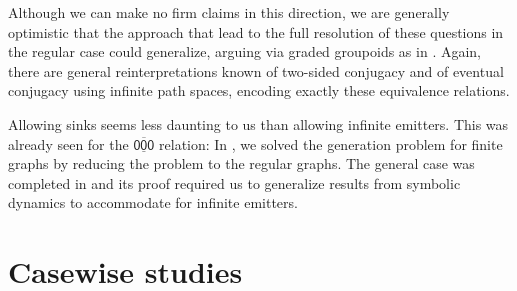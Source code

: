 \documentclass[12pt]{amsbook}%
\theoremstyle{defin}
\theoremstyle{remark}
\numberwithin{equation}{chapter}
\numberwithin{theor}{section}
\newcommand{\xyz}[1]{\mbox{$\mathsf{#1}$}}
\newcommand{\xyzrel}[1]{\mbox{$\overline{\underline{\mathsf{ #1}}}$}}
\begin{document}
Although we can make no firm claims in this direction, we are generally optimistic that the approach that lead to the full resolution of these questions in the regular case could generalize, arguing via graded groupoids as in \cite{tmcjr:dgigc}. Again, there are general reinterpretations known of two-sided conjugacy and of eventual conjugacy using infinite path spaces, encoding exactly these equivalence relations.

Allowing sinks seems less daunting to us than allowing infinite emitters.  This was already seen for the $\xyzrel{000}$ relation:  In \cite{segrerapws:gcgcfg}, we solved the generation problem for finite graphs by reducing the problem to the regular graphs.  The general case was completed in \cite{segrerapws:ccuggs} and its proof required us to generalize results from symbolic dynamics to accommodate for infinite emitters.

\part{Casewise studies}\label{casepart}
\newcommand{\elsewhere}{\cellcolor{lgray}{}}
\newcommand{\elsewhered}{\cellcolor{lgray}{+}}
\newcommand{\here}{\cellcolor{orange}{}}
\newcommand{\hered}{\cellcolor{orange}{+}}
\newcommand{\sopen}{\cellcolor{black}{}}
\newcommand{\sopenbut}{\cellcolor{black}{\textcolor{white}{!}}}
\newcommand{\statusbar}[8]{\begin{center}\begin{tabular}{|c|c|c|c|c|c|c|c|}\hline\small\xyz{000}&\small\xyz{001}&\small\xyz{010}&\small\xyz{011}&\small\xyz{100}&\small\xyz{101}&\small\xyz{110}&\small\xyz{111}\\\hline#1&#2&#3&#4&#5&#6&#7&#8\\\hline\end{tabular}\end{center}}
\end{document}
